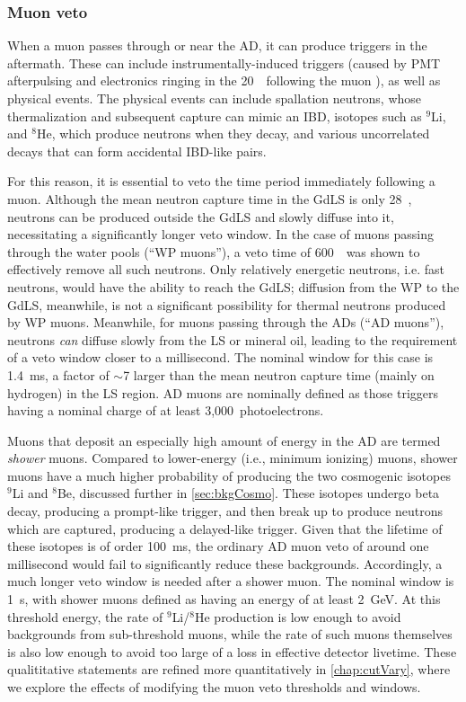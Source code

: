 \documentclass[../thesis.tex]{subfiles}
\begin{document}
\subsubsection{Muon veto}
\label{sec:selMuonVeto}

When a muon passes through or near the AD, it can produce triggers in the aftermath. These can include instrumentally-induced triggers (caused by PMT afterpulsing and electronics ringing in the 20~\us\ following the muon \cite{Jetter_2012}), as well as physical events. The physical events can include spallation neutrons, whose thermalization and subsequent capture can mimic an IBD, isotopes such as $^9$Li, and $^8$He, which produce neutrons when they decay, and various uncorrelated decays that can form accidental IBD-like pairs.

For this reason, it is essential to veto the time period immediately following a muon. Although the mean neutron capture time in the GdLS is only 28~\us, neutrons can be produced outside the GdLS and slowly diffuse into it, necessitating a significantly longer veto window. In the case of muons passing through the water pools (``WP muons''), a veto time of 600~\us\ was shown to effectively remove all such neutrons. Only relatively energetic neutrons, i.e. fast neutrons, would have the ability to reach the GdLS; diffusion from the WP to the GdLS, meanwhile, is not a significant possibility for thermal neutrons produced by WP muons. Meanwhile, for muons passing through the ADs (``AD muons''), neutrons \emph{can} diffuse slowly from the LS or mineral oil, leading to the requirement of a veto window closer to a millisecond. The nominal window for this case is 1.4~ms, a factor of $\sim$7 larger than the mean neutron capture time (mainly on hydrogen) in the LS region. AD muons are nominally defined as those triggers having a nominal charge of at least 3,000~photoelectrons.

Muons that deposit an especially high amount of energy in the AD are termed \emph{shower} muons. Compared to lower-energy (i.e., minimum ionizing) muons, shower muons have a much higher probability of producing the two cosmogenic isotopes $^9$Li and $^8$Be, discussed further in \autoref{sec:bkgCosmo}. These isotopes undergo beta decay, producing a prompt-like trigger, and then break up to produce neutrons which are captured, producing a delayed-like trigger. Given that the lifetime of these isotopes is of order 100~ms, the ordinary AD muon veto of around one millisecond would fail to significantly reduce these backgrounds. Accordingly, a much longer veto window is needed after a shower muon. The nominal window is 1~s, with shower muons defined as having an energy of at least 2~GeV. At this threshold energy, the rate of $^9$Li/$^8$He production is low enough to avoid backgrounds from sub-threshold muons, while the rate of such muons themselves is also low enough to avoid too large of a loss in effective detector livetime. These qualititative statements are refined more quantitatively in \autoref{chap:cutVary}, where we explore the effects of modifying the muon veto thresholds and windows.
\end{document}
